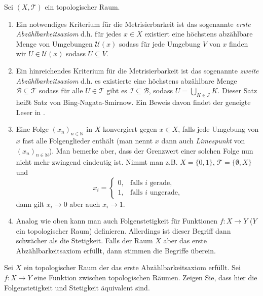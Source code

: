 \documentclass[
12pt, 
openany, 
a4paper, 
final,
fleqn, 
]{myclass}
\numberwithin{equation}{chapter}
\numberwithin{section}{chapter}
\newcommand{\NN}{\mathbb N}
\newcommand{\varT}{\mathcal T}
\newcommand{\union}{\bigcup}
\renewcommand{\cite}[2][]{}
\begin{document}
\begin{rmk}\label{1.22}
Sei $(X, \varT)$ ein topologischer Raum. 
\begin{enumerate}
\item Ein notwendiges Kriterium für die Metrisierbarkeit ist das sogenannte \emph{erste Abzählbarkeitsaxiom} d.h. für jedes $x\in X$ existiert eine höchstens abzählbare Menge von Umgebungen $\mathcal U(x)$ sodass für jede Umgebung $V$ von $x$ finden wir $U\in \mathcal U(x) $ sodass $U \subseteq V$. 

\item Ein hinreichendes Kriterium für die Metrisierbarkeit ist das sogenannte \emph{zweite Abzählbarkeitsaxiom} d.h. es existierte eine höchstens abzählbare Menge $\mathcal B \subseteq \varT $ sodass für alle $U\in \varT $ gibt es $\mathcal I \subseteq \mathcal B$, sodass $U = \union_{K\in \mathcal I} K$. Dieser Satz heißt Satz von Bing-Nagata-Smirnow. Ein Beweis davon findet der geneigte Leser in \cite{munkres_topology_2021}.

\item Eine Folge $(x_n)_{n\in\NN}$ in $X$ konvergiert gegen $x\in X$, falls jede Umgebung von $x$ fast alle Folgenglieder enthält (man nennt $x$ dann auch \emph{Limespunkt} von $ (x_{n})_{n\in \NN} $). Man bemerke aber, dass der Grenzwert einer solchen Folge nun nicht mehr zwingend eindeutig ist. Nimmt man z.B. $X=\{0, 1\}$, $\varT = \{\emptyset, X\}$ und 
\[
x_i = \begin{cases}
0, & \text{falls $i$ gerade,}\\
1, & \text{falls $i$ ungerade,}
\end{cases}
\]
dann gilt $x_i \to 0$ aber auch $x_i \to 1$. 

\item Analog wie oben kann man auch Folgenstetigkeit für Funktionen $f: X\to Y$ ($Y$ ein topologischer Raum) definieren. Allerdings ist dieser Begriff dann schwächer als die Stetigkeit. Falls der Raum $X$ aber das erste Abzählbarkeitsaxiom erfüllt, dann stimmen die Begriffe überein. 
\end{enumerate}
\end{rmk}
\begin{ex}
Sei $X$ ein topologischer Raum der das erste Abzählbarkeitsaxiom erfüllt. Sei $f: X\to Y$ eine Funktion zwischen topologischen Räumen. Zeigen Sie, dass hier die Folgenstetigkeit und Stetigkeit äquivalent sind. 
\end{ex}
\end{document}

